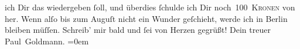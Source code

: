 \begin{ledgroupsized}[t]{13cm}
               ich Dir das wiedergeben ſoll, und überdies ſchulde ich Dir noch 100 \textsc{Kronen} von \label{K_L02917-5v}\label{K_L02917-5h} her. Wenn alſo bis zum Auguſt nicht ein Wunder
               geſchieht, werde ich in Berlin bleiben
               müſſen.\pend
           \pstart
           Schreib’ mir bald und ſei von Herzen gegrüßt!\pend
           \pstart
           Dein treuer {\\[\baselineskip]}\spacefill\mbox{Paul Goldmann.}\pend
           \leftskip=0em{}
         
         \endnumbering{}\end{ledgroupsized}  \newcommand{\dateiname}{L02917}\newcommand{\titel}{Paul Goldmann an Arthur Schnitzler, 29. 5. [1900]}\newcommand{\editorInnen}{Martin Anton Müller und Laura Untner}
      